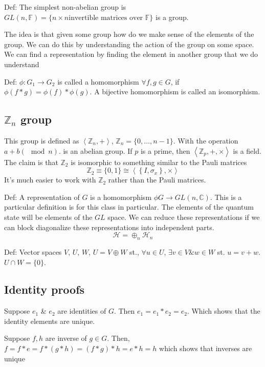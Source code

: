 Def: The simplest non-abelian group is $GL(n, \mathbb{F}) = \{ n\times n 
\text{invertible matrices over } \mathbb{F}\}$ is a group.

The idea is that given
some group how do we make sense of the elements of the group. We can do this by understanding
the action of the group on some space. We can find a representation by finding the element
in another group that we do understand

Def: $\phi: G_1 \rightarrow G_2$ is called a homomorphism $\forall f, g \in G$, if
$\phi \left(f * g\right) = \phi(f) * \phi(g)$. 
A bijective homomorphism is called an isomorphism.

\subsection{$\mathbb{Z}_n$ group}
This group is defined as $\left<\mathbb{Z}_n, +\right>$, $\mathbb{Z}_n = \{0, \dots, n-1 \}$.
With the operation $a + b (\mod n)$. is an abelian group. If $p$ is a prime, then
$\left<\mathbb{Z}_p, +, \times\right>$ is a field. The claim is that $\mathbb{Z}_2$ is 
isomorphic to something similar to the Pauli matrices
$$
    \mathbb{Z}_2 \equiv \{0, 1 \} \cong
    \left<\left\{I, \sigma_x\right\}, \times\right>
$$
It's much easier to work with $\mathbb{Z}_2$ rather than the Pauli matrices.

Def: A representation of $G$ is a homomorphism $\phi G \rightarrow GL(n, \mathbb{C})$. This
is a particular definition is for this class in particular. The elements of the quantum state
will be elements of the $GL$ space. We can reduce these representations if we can block
diagonalize these representations into independent parts.
$$
    \mathcal{H} = \oplus_{n} \mathcal{H}_n
$$

Def: Vector spaces $V$, $U$, $W$, $U = V \oplus W$ st., 
$\forall u \in U$, $\exists v \in V \& w \in W$ st. $u = v + w$. $U \cap W = \{0\}$.

\subsection{Identity proofs}
Suppose $e_1$ \& $e_2$ are identities of $G$. Then
$e_1 = e_1 * e_2 = e_2$.
Which shows that the identity elements are unique.

Suppose $f, h$ are inverse of $g \in G$. Then,
$f = f * e = f * (g * h) = (f * g) * h = e * h = h$
which shows that inverses are unique

